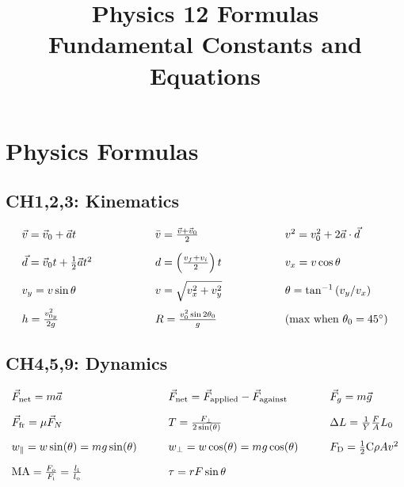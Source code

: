 \documentclass[12pt,a4paper]{article}
\title{\textbf{Physics 12 Formulas}\\\large Fundamental Constants and Equations}
\date{}
\begin{document}
\maketitle

\section{Physics Formulas}

\subsection{CH1,2,3: Kinematics}
\begin{align*}
  \begin{array}{l@{\hspace{2cm}}l@{\hspace{2cm}}l}
    \vec{v} = \vec{v}_0 + \vec{a}t & \bar{v} = \frac{\vec{v} + \vec{v}_0}{2} & v^2 = v_0^2 + 2\vec{a} \cdot \vec{d} \\[1em]
    \vec{d} = \vec{v}_0t + \frac{1}{2}\vec{a}t^2 & d = \left(\frac{v_f + v_i}{2}\right)t & v_x = v \cos \theta \\[1em]
    v_y = v \sin \theta & v = \sqrt{v_x^2 + v_y^2} & \theta = \tan^{-1}\left(v_y / v_x\right) \\[1em]
    h = \frac{v_{0y}^2}{2g} & R = \frac{v_0^2 \sin 2\theta_0}{g} & \text{(max when }\theta_0 = 45^\circ\text{)}
  \end{array}
\end{align*}

\subsection{CH4,5,9: Dynamics}
\begin{align*}
\begin{array}{l@{\hspace{1cm}}l@{\hspace{1cm}}l}
\vec{F}_\text{net} = m\vec{a} & \vec{F}_\text{net} = \vec{F}_\text{applied} - \vec{F}_\text{against} & \vec{F}_g = m\vec{g} 
\\[1em]
\vec{F}_\text{fr} = \mu \vec{F}_N & T=\frac{F_{\perp}}{2 \sin (\theta)} & \Delta L=\frac{1}{Y} \frac{F}{A} L_0 \\[1em]
w_{\|}=w \sin (\theta)=m g \sin (\theta) & w_{\perp}=w \cos (\theta)=m g \cos (\theta) & F_{\mathrm{D}}=\frac{1}{2} \mathrm{C} \rho A v^2 \\[1em]
\mathrm{MA}=\frac{F_{\mathrm{o}}}{F_{\mathrm{i}}}=\frac{l_{\mathrm{i}}}{l_{\mathrm{o}}} & \tau=r F \sin \theta & 
\end{array}
\end{align*}
\end{document}
